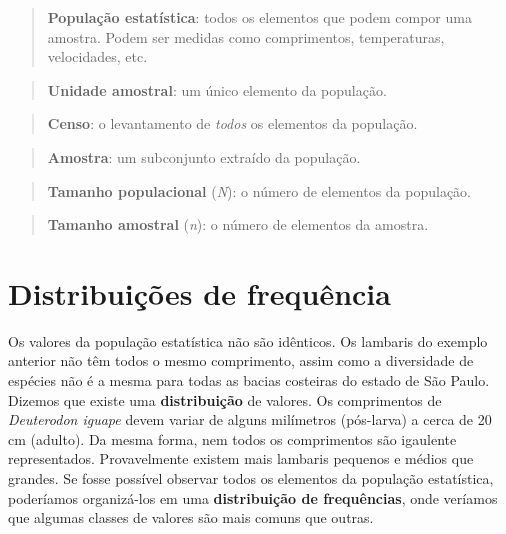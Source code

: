 \documentclass[
]{book}
\begin{document}
\begin{quote}
\textbf{População estatística}: todos os elementos que podem compor uma amostra. Podem ser medidas como comprimentos, temperaturas, velocidades, etc.
\end{quote}

\begin{quote}
\textbf{Unidade amostral}: um único elemento da população.
\end{quote}

\begin{quote}
\textbf{Censo}: o levantamento de \emph{todos} os elementos da população.
\end{quote}

\begin{quote}
\textbf{Amostra}: um subconjunto extraído da população.
\end{quote}

\begin{quote}
\textbf{Tamanho populacional} (\emph{N}): o número de elementos da população.
\end{quote}

\begin{quote}
\textbf{Tamanho amostral} (\emph{n}): o número de elementos da amostra.
\end{quote}

\hypertarget{distribuiuxe7uxf5es-de-frequuxeancia}{%
\section{Distribuições de frequência}\label{distribuiuxe7uxf5es-de-frequuxeancia}}

Os valores da população estatística não são idênticos. Os lambaris do exemplo anterior não têm todos o mesmo comprimento, assim como a diversidade de espécies não é a mesma para todas as bacias costeiras do estado de São Paulo. Dizemos que existe uma \textbf{distribuição} de valores. Os comprimentos de \emph{Deuterodon iguape} devem variar de alguns milímetros (pós-larva) a cerca de 20 cm (adulto). Da mesma forma, nem todos os comprimentos são igaulente representados. Provavelmente existem mais lambaris pequenos e médios que grandes. Se fosse possível observar todos os elementos da população estatística, poderíamos organizá-los em uma \textbf{distribuição de frequências}, onde veríamos que algumas classes de valores são mais comuns que outras.
\end{document}
